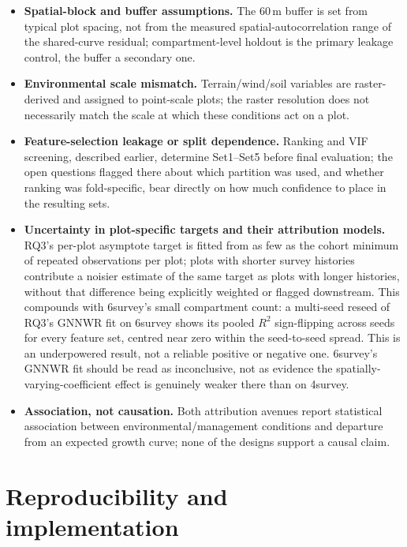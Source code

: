 \documentclass[11pt,a4paper]{report}
\begin{document}
\begin{itemize}
\setlength\itemsep{0pt}
\item \textbf{Spatial-block and buffer assumptions.} The 60\,m buffer is set from typical plot
  spacing, not from the measured spatial-autocorrelation range of the shared-curve residual;
  compartment-level holdout is the primary leakage control, the buffer a
  secondary one.
\item \textbf{Environmental scale mismatch.} Terrain/wind/soil variables are raster-derived and
  assigned to point-scale plots; the raster resolution does not necessarily match the scale at
  which these conditions act on a plot.
\item \textbf{Feature-selection leakage or split dependence.} Ranking and VIF screening, described
  earlier, determine Set1--Set5 before final evaluation; the open questions
  flagged there about which partition was used, and whether ranking was fold-specific, bear
  directly on how much confidence to place in the resulting sets.
\item \textbf{Uncertainty in plot-specific targets and their attribution models.} RQ3's per-plot
  asymptote target is fitted from as few as the cohort minimum of repeated
  observations per plot; plots with shorter survey histories contribute a noisier estimate of the
  same target as plots with longer histories, without that difference being explicitly weighted or
  flagged downstream. This compounds with 6survey's small compartment count: a multi-seed reseed
  of RQ3's GNNWR fit on 6survey shows its pooled $R^2$ sign-flipping across seeds for every feature
  set, centred near zero within the seed-to-seed spread. This is an underpowered result, not a
  reliable positive or negative one. 6survey's GNNWR fit should be read as inconclusive, not as
  evidence the spatially-varying-coefficient effect is genuinely weaker there than on 4survey.
\item \textbf{Association, not causation.} Both attribution avenues report statistical association
  between environmental/management conditions and departure from
  an expected growth curve; none of the designs support a causal claim.
\end{itemize}

\section{Reproducibility and implementation}
\end{document}
